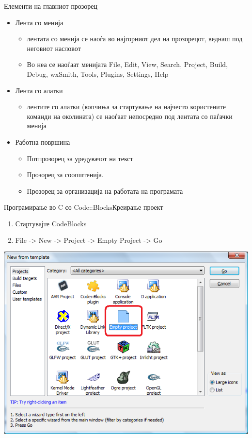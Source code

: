 \begin{frame}{Елементи на главниот прозорец}
\begin{itemize}
  \item Лента со менија
    \begin{itemize}
      \item лентата со менија се наоѓа во најгорниот дел на прозорецот, веднаш под неговиот насловот 
      \item Во неа се наоѓаат менијата File, Edit, View, Search, Project, Build,
      Debug, wxSmith, Tools, Plugins, Settings, Help
    \end{itemize}
    \item Лента со алатки
    \begin{itemize}
      \item лентите со алатки (копчиња за стартување на најчесто користените
      команди на околината) се наоѓаат непосредно под лентата со паѓачки менија
    \end{itemize}
    \item Работна површина
    \begin{itemize}
      \item Потпрозорец за уредувачот на текст
      \item Прозорец за соопштенија.
      \item Прозорец за организација на работата на програмата
    \end{itemize}   
\end{itemize}
\end{frame}

\begin{frame}{Програмирање во C со Code::Blocks}{Креирање проект}
\begin{enumerate}
  \item Стартувајте CodeBlocks
  \item File -> New -> Project -> Empty Project -> Go 
\end{enumerate}
\begin{center}
\includegraphics[scale=0.3]{images/cb_new}
\end{center}
\end{frame}

